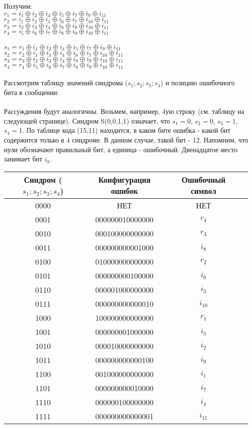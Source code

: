 Получим: 
\\$r_1 = i_1 \oplus i_2 \oplus i_4  \oplus i_5  \oplus i_7  \oplus i_9  \oplus i_{11}$ 
\\$r_2 = i_1 \oplus i_3 \oplus i_4  \oplus i_6  \oplus i_7  \oplus i_{10}  \oplus i_{11}$
\\$r_3 = i_2 \oplus i_3 \oplus i_4  \oplus i_8  \oplus i_9  \oplus i_{10}  \oplus i_{11}$
\\$r_4 = i_5 \oplus i_6 \oplus i_7  \oplus i_8  \oplus i_9  \oplus i_{10}  \oplus i_{11}$
\\
\\$s_1 = r_1 \oplus i_1 \oplus i_2 \oplus i_4  \oplus i_5  \oplus i_7  \oplus i_9  \oplus i_{11}$
\\$s_2 = r_2 \oplus i_1 \oplus i_3 \oplus i_4 \oplus i_6  \oplus i_7  \oplus i_{10}  \oplus i_{11}$
\\$s_3 = r_3 \oplus i_2 \oplus i_3 \oplus i_4 \oplus i_8  \oplus i_9  \oplus i_{10}  \oplus i_{11}$
\\$s_4 = r_4 \oplus i_5 \oplus i_6 \oplus i_7  \oplus i_8  \oplus i_9  \oplus i_{10}  \oplus i_{11}$
\\
\\Рассмотрим таблицу значений синдрома ($s_1;s_2;s_3;s_4$) и позицию ошибочного бита в сообщении: \\\\
Рассуждения будут аналогичны. Возьмем, например, 4ую строку (см. таблицу на следующей странице). Синдром S(0,0,1,1) означает, что $s_1 = 0$, $s_2 = 0$, $s_3 = 1$, $s_4 = 1$. По таблице кода (15,11) находится, в каком бите ошибка - какой бит содержится только в 4 синдроме. В данном случае, такой бит - 12. Напомним, что нули обозначают правильный бит, а единица - ошибочный. Двенадцатое место занимает бит $i_8$.
\begin{tabular}{|c|c|c|c|}
\hline
Синдром ($s_1;s_2;s_3;s_4$) & Конфигурация ошибок & Ошибочный символ\\
\hline
0000 & НЕТ & НЕТ \\
0001 & 000000010000000 & $r_4$ \\
0010 & 000100000000000 & $r_3$ \\
0011 & 000000000001000 & $i_8$ \\
0100 & 010000000000000 & $r_2$ \\
0101 & 000000000100000 & $i_6$ \\
0110 & 000001000000000 & $i_3$ \\
0111 & 000000000000010 & $i_{10}$ \\
1000 & 100000000000000 & $r_1$\\
1001 & 000000001000000 & $i_5$\\
1010 & 000010000000000& $i_2$\\
1011 & 000000000000100 & $i_9$\\
1100 & 001000000000000 & $i_1$\\
1101 & 000000000010000 & $i_7$\\
1110 & 000000100000000 & $i_4$\\
1111 & 000000000000001 & $i_{11}$\\
\hline
\end{tabular}